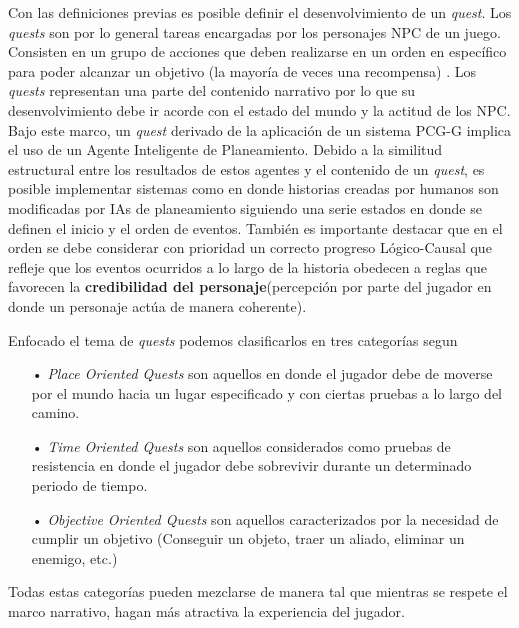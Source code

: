Con las definiciones previas es posible definir el desenvolvimiento de un \textit{quest}. Los \textit{quests} son por lo general tareas encargadas por los personajes \ac{NPC} de un juego. Consisten en un grupo de acciones que deben realizarse en un orden en específico para poder alcanzar un objetivo (la mayoría de veces una recompensa) \cite{breault2018let}. Los \textit{quests} representan una parte del contenido narrativo por lo que su desenvolvimiento debe ir acorde con el estado del mundo y la actitud de los \ac{NPC}. Bajo este marco, un \textit{quest} derivado de la aplicación de un sistema \ac{PCG-G} implica el uso de un Agente Inteligente de Planeamiento. Debido a la similitud estructural entre los resultados de estos agentes y el contenido de un \textit{quest}, es posible implementar sistemas como \cite{doran2011prototype} \cite{riedl2011game} \cite{yu2012sequential} en donde historias creadas por humanos son modificadas por IAs de planeamiento siguiendo una serie estados en donde se definen el inicio y el orden de eventos. También es importante destacar que en el orden se debe considerar con prioridad un correcto progreso Lógico-Causal que refleje que los eventos ocurridos a lo largo de la historia obedecen a reglas que favorecen la \textbf{credibilidad del personaje}(percepción por parte del jugador en  donde un personaje actúa de manera coherente).

Enfocado el tema de \textit{quests} podemos clasificarlos en tres categorías segun \cite{cheong2016planning}

\begin{itemize}
\item[•] \textit{Place Oriented Quests} son aquellos en donde el jugador debe de moverse por el mundo hacia un lugar especificado y con ciertas pruebas a lo largo del camino.
\item[•] \textit{Time Oriented Quests} son aquellos considerados como pruebas de resistencia en donde el jugador debe sobrevivir durante un determinado periodo de tiempo.
\item[•] \textit{Objective Oriented Quests} son aquellos caracterizados por la necesidad de cumplir un objetivo (Conseguir un objeto, traer un aliado, eliminar un enemigo, etc.)
\end{itemize}

Todas estas categorías pueden mezclarse de manera tal que mientras se respete el marco narrativo, hagan más atractiva la experiencia del jugador.

